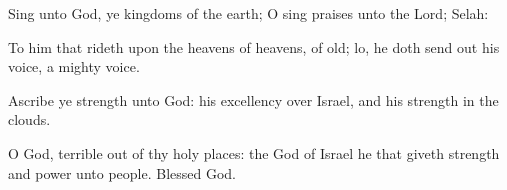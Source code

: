{\Q {}Sing unto
God, ye
kingdoms of the
earth; O sing
praises unto the
Lord;
Selah:


\par }{\Q {}To him that
rideth upon the
heavens of
heavens,
{} of
old; lo, he doth send
out his
voice,
{} a
mighty
voice.


\par }{\Q {}Ascribe ye
strength unto
God: his
excellency
{} over
Israel, and his
strength
{} in the
clouds.


\par }{\Q {}O
God,
{}
terrible out of thy holy
places: the
God of
Israel
{} he that
giveth
strength and
power unto
{}
people.
Blessed
{}
God.




\par }
